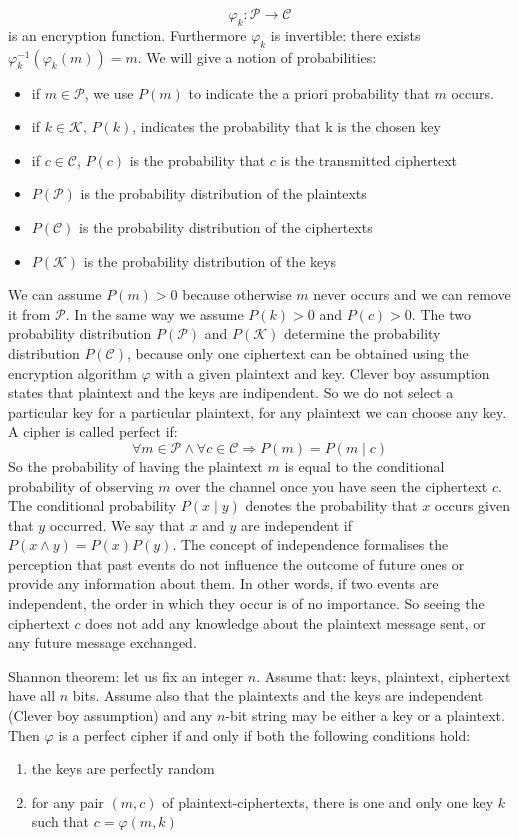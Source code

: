 $$\varphi_k : \mathcal{P} \rightarrow \mathcal{C}$$ is an encryption function.
Furthermore $\varphi_k$ is invertible: there exists $\varphi_k ^{-1}(\varphi_k(m)) = m$.
We will give a notion of probabilities:
\begin{itemize}
	\item if $m \in \mathcal{P}$, we use $P(m)$ to indicate the a priori probability that $m$ occurs.
	\item if $k \in \mathcal{K}$, $P(k)$, indicates the probability that k is the chosen key
	\item if $c \in \mathcal{C}$, $P(c)$ is the probability that $c$ is the transmitted ciphertext
	\item $P(\mathcal{P})$ is the probability distribution of the plaintexts
	\item $P(\mathcal{C})$ is the probability distribution of the ciphertexts
	\item $P(\mathcal{K})$ is the probability distribution of the keys
\end{itemize}
We can assume $P(m) > 0$ because otherwise $m$ never occurs and we can remove it from $\mathcal{P}$. In the same way we assume $P(k) > 0$ and $P(c) > 0$. The two probability distribution $P(\mathcal{P})$ and $P(\mathcal{K})$ determine the
probability distribution $P(\mathcal{C})$, because only one ciphertext can be obtained using the encryption algorithm $\varphi$ with a given plaintext and key.
Clever boy assumption states that plaintext and the keys are indipendent. So we do not select a particular key for a particular plaintext, for any plaintext we can choose any key. A cipher is called perfect if:
$$\forall m \in\mathcal{P} \land \forall c \in\mathcal{C} \Longrightarrow P(m) = P(m \mid c) $$
So the probability of having the plaintext $m$ is equal to the conditional probability of observing $m$ over the channel once you have seen the ciphertext $c$. The conditional probability $P(x \mid y)$ denotes the probability that $x$ occurs given that $y$ occurred. We say that $x$ and $y$ are independent if $P(x \land y) = P(x)P(y)$. The concept of independence formalises the perception that past events do not influence the outcome of future ones or provide any information about them. In other words, if two events are independent, the order in which they occur is of no importance. So seeing the ciphertext $c$ does not add any knowledge about the plaintext message sent, or any future message exchanged.

Shannon theorem: let us fix an integer $n$. Assume that: keys, plaintext, ciphertext have all $n$ bits. Assume also that the plaintexts and the keys are independent (Clever boy assumption) and any $n$-bit string may be either a key or a plaintext. Then $\varphi$ is a perfect cipher if and only if both the following conditions hold:
\begin{enumerate}
	\item the keys are perfectly random
	\item for any pair $(m,c)$ of plaintext-ciphertexts, there is one and only one key $k$ such that $c = \varphi(m,k)$
\end{enumerate}

